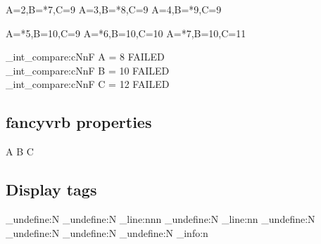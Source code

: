 \begin{CDRBlock} [
  tags={B, A},
  numbers=left,
  firstnumber=last,
]
A=2,B=*7,C=9
A=3,B=*8,C=9
A=4,B=*9,C=9
\end{CDRBlock}
\begin{CDRBlock} [
  tags={A,C},
  numbers=left,
  firstnumber=last,
]
A=*5,B=10,C=9
A=*6,B=10,C=10
A=*7,B=10,C=11
\end{CDRBlock}

\ExplSyntaxOn
\CDR_int_compare:cNnF { A } = 8 { FAILED \\ }
\CDR_int_compare:cNnF { B } = {10} { FAILED \\ }
\CDR_int_compare:cNnF { C } = {12} { FAILED \\ }
\ExplSyntaxOff

\subsection{\textsf{fancyvrb} properties}

\begin{CDRBlock} [
  tags=none,
  numbers=left,
  firstnumber=last,
]
A
B
C
\end{CDRBlock}

\newpage

\subsection{Display tags}

\makeatletter
\ExplSyntaxOn

\cs_undefine:N \CDR@Line
\cs_undefine:N \CDR_line:nnn
\cs_undefine:N \CDR_line:nn
\cs_undefine:N \CDR@NumberFormat
\cs_undefine:N \CDR@TagsFormat
\cs_undefine:N \CDR@NumberSep
\cs_undefine:N \CDR_info:n

